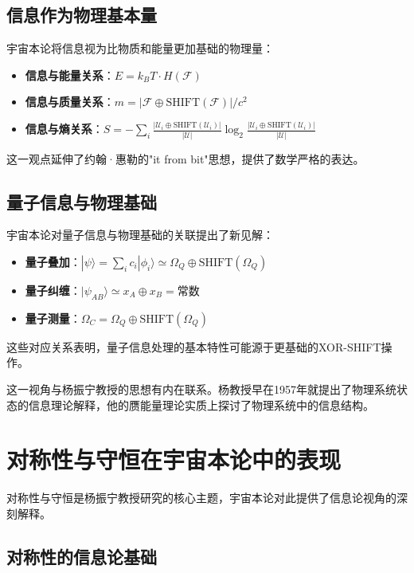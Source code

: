 \subsection{信息作为物理基本量}

宇宙本论将信息视为比物质和能量更加基础的物理量：

\begin{itemize}
  \item \textbf{信息与能量关系}：$E = k_B T \cdot H(\mathcal{F})$
  \item \textbf{信息与质量关系}：$m = |\mathcal{F} \oplus \text{SHIFT}(\mathcal{F})|/c^2$
  \item \textbf{信息与熵关系}：$S = -\sum_{i}\frac{|\mathcal{U}_i \oplus \text{SHIFT}(\mathcal{U}_i)|}{|\mathcal{U}|}\log_2\frac{|\mathcal{U}_i \oplus \text{SHIFT}(\mathcal{U}_i)|}{|\mathcal{U}|}$
\end{itemize}

这一观点延伸了约翰·惠勒的"it from bit"思想，提供了数学严格的表达。

\subsection{量子信息与物理基础}

宇宙本论对量子信息与物理基础的关联提出了新见解：

\begin{itemize}
  \item \textbf{量子叠加}：$|\psi\rangle = \sum_i c_i |\phi_i\rangle \simeq \Omega_Q \oplus \text{SHIFT}(\Omega_Q)$
  \item \textbf{量子纠缠}：$|\psi_{AB}\rangle \simeq x_A \oplus x_B = \text{常数}$
  \item \textbf{量子测量}：$\Omega_C = \Omega_Q \oplus \text{SHIFT}(\Omega_Q)$
\end{itemize}

这些对应关系表明，量子信息处理的基本特性可能源于更基础的XOR-SHIFT操作。

这一视角与杨振宁教授的思想有内在联系。杨教授早在1957年就提出了物理系统状态的信息理论解释，他的赝能量理论实质上探讨了物理系统中的信息结构。

\section{对称性与守恒在宇宙本论中的表现}

对称性与守恒是杨振宁教授研究的核心主题，宇宙本论对此提供了信息论视角的深刻解释。

\subsection{对称性的信息论基础}


